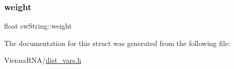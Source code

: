 \mbox{\label{structsw_string_a59272a18126fcf037501e0c80982949a}} 
\subsubsection{\texorpdfstring{weight}{weight}}
{\footnotesize\ttfamily float sw\+String\+::weight}



The documentation for this struct was generated from the following file\+:\begin{DoxyCompactItemize}
\item 
Vienna\+R\+N\+A/\mbox{\hyperlink{dist__vars_8h}{dist\+\_\+vars.\+h}}\end{DoxyCompactItemize}

